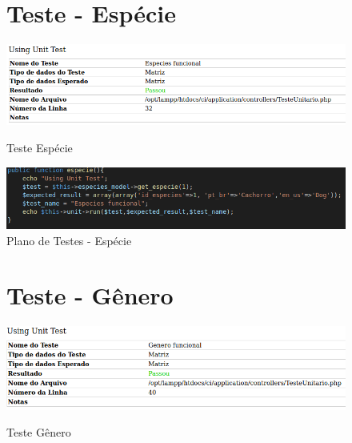 \begin{apendicesenv}
\begin{figure}[!htbp]
\begin{flushleft}
    \section{Teste - Espécie}
\end{flushleft}
    \centering
    \caption{Teste Espécie}
    \includegraphics[width=1\textwidth,pagecommand=\chapter{}]{imagens/teste_especie.png}
    \label{teste-especie}
\end{figure}

\begin{figure}[htb]
    \centering
    \caption{\label{fig_timeline}Plano de Testes - Espécie}
	\includegraphics[width=1\textwidth]{imagens/cod_teste_especie.png}
\end{figure}

\begin{figure}[!htbp]
\begin{flushleft}
    \section{Teste - Gênero}
\end{flushleft}
    \centering
    \caption{Teste Gênero}
    \includegraphics[width=1\textwidth,pagecommand=\chapter{}]{imagens/teste_genero.png}
    \label{teste-genero}
\end{figure}


\end{apendicesenv}
